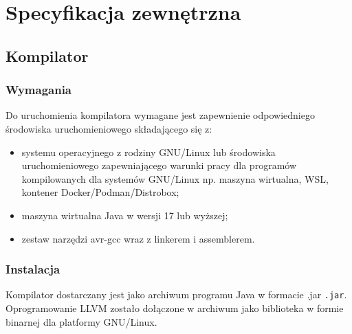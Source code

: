 \chapter{Specyfikacja zewnętrzna}
\label{ch:04}
\section{Kompilator}
\subsection{Wymagania}
Do uruchomienia kompilatora wymagane jest zapewnienie odpowiedniego środowiska uruchomieniowego składającego się z:
\begin{itemize}
\item systemu operacyjnego z rodziny GNU/Linux lub środowiska uruchomieniowego zapewniającego warunki pracy dla programów kompilowanych dla systemów GNU/Linux np. maszyna wirtualna, WSL, kontener Docker/Podman/Distrobox;
\item maszyna wirtualna  Java w wersji 17 lub wyższej;
\item zestaw  narzędzi avr-gcc wraz z linkerem i assemblerem.
\end{itemize}

\subsection{Instalacja}
Kompilator dostarczany jest jako archiwum programu Java w formacie .jar \lstinline|.jar|. Oprogramowanie LLVM zostało dołączone w archiwum jako biblioteka w formie binarnej dla platformy GNU/Linux.

